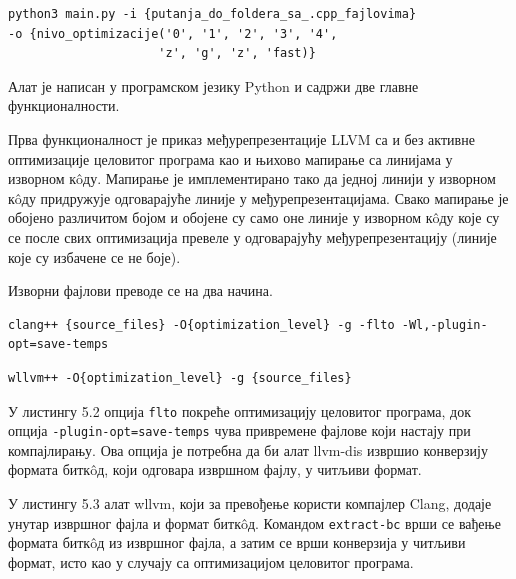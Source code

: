 \documentclass[12pt,oneside]{memoir}
\begin{document}
\begin{lstlisting}[frame=single,caption=Шаблон покретања алата,captionpos=b]
python3 main.py -i {putanja_do_foldera_sa_.cpp_fajlovima}
-o {nivo_optimizacije('0', '1', '2', '3', '4',
                     'z', 'g', 'z', 'fast)}

\end{lstlisting}

Алат је написан у програмском језику Python и садржи две главне функционалности.

Прва функционалност је приказ међурепрезентације LLVM са и без активне оптимизације
целовитог програма као и њихово мапирање са линијама у изворном к\^{o}ду.
Мапирање је имплементирано тако да једној линији у изворном к\^{o}ду придружује
одговарајуће линије у међурепрезентацијама.
Свако мапирање је обојено различитом бојом и обојене су само оне линије у изворном
к\^{o}ду које су се после свих оптимизација превеле у одговарајућу међурепрезентацију
 (линије које су избачене се не боје).
 
Изворни фајлови преводе се на два начина.

\begin{lstlisting}[frame=single, caption=Шаблон превођења изворних фајлова са оптимизацијом целовитог програма, captionpos=b]
clang++ {source_files} -O{optimization_level} -g -flto -Wl,-plugin-opt=save-temps
\end{lstlisting}
 
\begin{lstlisting}[frame=single, caption=Шаблон превођења изворних фајлова без оптимизације целовитог програма, captionpos=b]
wllvm++ -O{optimization_level} -g {source_files}
\end{lstlisting}
 
У листингу 5.2 опција \texttt{flto} покреће оптимизацију целовитог програма,
док опција \texttt{-plugin-opt=save-temps} чува привремене фајлове који настају
при компајлирању.
Ова опција је потребна да би алат llvm-dis извршио конверзију формата битк\^{o}д,
који одговара извршном фајлу, у читљиви формат.

У листингу 5.3 алат wllvm, који за превођење користи компајлер Clang, додаје унутар извршног фајла и формат битк\^{o}д. 
Командом \texttt{extract-bc} врши се вађење формата битк\^{o}д из извршног фајла, а затим се врши конверзија у читљиви формат, исто као у случају са оптимизацијом
целовитог програма.
\end{document}
